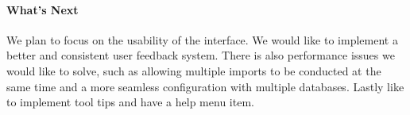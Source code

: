 \paragraph{What's Next}
We plan to focus on the usability of the interface. We would like to implement a better and consistent user feedback system. There is also performance issues we would like to solve, such as allowing multiple imports to be conducted at the same time and a more seamless configuration with multiple databases. Lastly like to implement tool tips and have a help menu item. 

